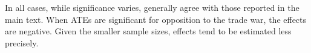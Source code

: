 In all cases, while significance varies, generally agree with those reported in the main text. When ATEs are significant for opposition to the trade war, the effects are negative. Given the smaller sample sizes, effects tend to be estimated less precisely.








